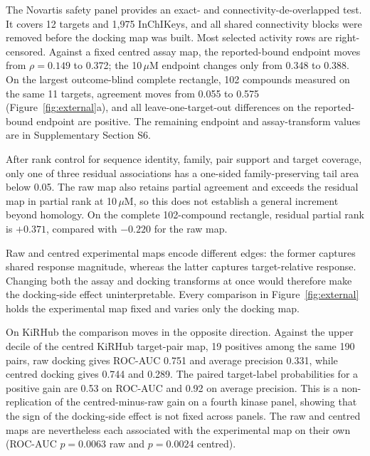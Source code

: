 The Novartis safety panel provides an exact- and connectivity-de-overlapped test. It covers 12 targets and
1{,}975 InChIKeys, and all shared connectivity blocks were removed before the docking map was
built. Most selected activity rows are right-censored. Against a fixed centred assay map, the
reported-bound endpoint moves from $\rho=0.149$ to 0.372; the 10\,$\mu$M endpoint changes only
from 0.348 to 0.388. On the largest outcome-blind complete rectangle, 102 compounds measured on
the same 11 targets, agreement moves from 0.055 to 0.575 (Figure~\ref{fig:external}a), and all
leave-one-target-out differences on the reported-bound endpoint are positive. The remaining
endpoint and assay-transform values are in Supplementary Section S6.

After rank control for sequence identity, family, pair support and target coverage, only one of
three residual associations has a one-sided family-preserving tail area below 0.05. The raw map
also retains partial agreement and exceeds the residual map in partial rank at 10\,$\mu$M, so this does not
establish a general increment beyond homology. On the complete 102-compound rectangle, residual
partial rank is $+0.371$, compared with $-0.220$ for the raw map.

Raw and centred experimental maps encode different edges: the former captures shared response
magnitude, whereas the latter captures target-relative response. Changing both the assay and docking
transforms at once would therefore make the docking-side effect uninterpretable. Every comparison in
Figure~\ref{fig:external} holds the experimental map fixed and varies only the docking map.

On KiRHub the comparison moves in the opposite direction. Against the upper decile of the
centred KiRHub target-pair map, 19 positives among the same 190 pairs, raw docking gives
ROC-AUC 0.751 and average precision 0.331, while centred docking gives 0.744 and 0.289. The
paired target-label probabilities for a positive gain are 0.53 on ROC-AUC and 0.92 on average
precision. This is a non-replication of the centred-minus-raw gain on a fourth kinase panel,
showing that the sign of the docking-side effect is not fixed across panels. The raw and centred
maps are nevertheless each associated with the experimental map on their own
(ROC-AUC $p=0.0063$ raw and $p=0.0024$ centred).
